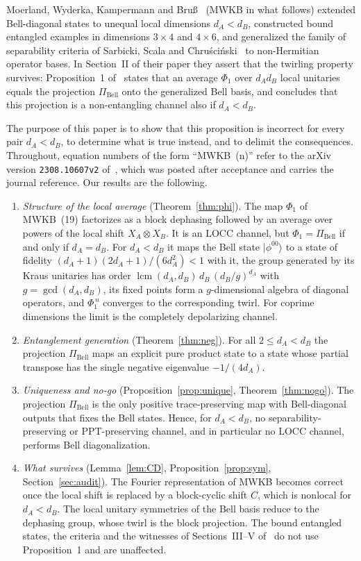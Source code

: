 \documentclass[11pt,a4paper]{article}
\theoremstyle{definition}
\theoremstyle{remark}
\newcommand{\ket}[1]{\lvert #1\rangle}
\newcommand{\dA}{d_A}
\newcommand{\dB}{d_B}
\newcommand{\PiB}{\Pi_{\mathrm{Bell}}}
\newcommand{\phib}[2]{\phi^{#1#2}}
\DeclareMathOperator{\lcm}{lcm}
\begin{document}
Moerland, Wyderka, Kampermann and Bru\ss{}~\cite{MWKB24} (MWKB in what follows) extended
Bell-diagonal states to unequal local dimensions $\dA<\dB$, constructed bound entangled
examples in dimensions $3\times4$ and $4\times6$, and generalized the family of separability
criteria of Sarbicki, Scala and Chru\'sci\'nski~\cite{SSC20} to non-Hermitian operator
bases. In Section~II of their paper they assert that the twirling property survives:
Proposition~1 of~\cite{MWKB24} states that an average $\Phi_1$ over $\dA\dB$ local unitaries
equals the projection $\PiB$ onto the generalized Bell basis, and concludes that this
projection is a non-entangling channel also if $\dA<\dB$.

The purpose of this paper is to show that this proposition is incorrect for every pair
$\dA<\dB$, to determine what is true instead, and to delimit the consequences. Throughout,
equation numbers of the form ``MWKB~(n)'' refer to the arXiv version
\texttt{2308.10607v2} of~\cite{MWKB24}, which was posted after acceptance and carries the
journal reference. Our results are the following.

\begin{enumerate}
\item \emph{Structure of the local average} (Theorem~\ref{thm:phi}). The map $\Phi_1$ of
MWKB~(19) factorizes as a block dephasing followed by an average over powers of the local
shift $X_A\otimes X_B$. It is an LOCC channel, but $\Phi_1=\PiB$ if and only if $\dA=\dB$.
For $\dA<\dB$ it maps the Bell state $\ket{\phib00}$ to a state of fidelity
$(\dA+1)(2\dA+1)/(6\dA^2)<1$ with it, the group generated by its Kraus unitaries has order
$\lcm(\dA,\dB)\,\dB\,(\dB/g)^{\dA}$ with $g=\gcd(\dA,\dB)$, its fixed points form a
$g$-dimensional algebra of diagonal operators, and $\Phi_1^{\,n}$ converges to the
corresponding twirl. For coprime dimensions the limit is the completely depolarizing
channel.
\item \emph{Entanglement generation} (Theorem~\ref{thm:neg}). For all $2\le\dA<\dB$ the
projection $\PiB$ maps an explicit pure product state to a state whose partial transpose
has the single negative eigenvalue $-1/(4\dA)$.
\item \emph{Uniqueness and no-go} (Proposition~\ref{prop:unique},
Theorem~\ref{thm:nogo}). The projection $\PiB$ is the only positive trace-preserving map
with Bell-diagonal outputs that fixes the Bell states. Hence, for $\dA<\dB$, no
separability-preserving or PPT-preserving channel, and in particular no LOCC channel,
performs Bell diagonalization.
\item \emph{What survives} (Lemma~\ref{lem:CD}, Proposition~\ref{prop:sym},
Section~\ref{sec:audit}). The Fourier representation of MWKB becomes correct once the local
shift is replaced by a block-cyclic shift $C$, which is nonlocal for $\dA<\dB$. The local
unitary symmetries of the Bell basis reduce to the dephasing group, whose twirl is the
block projection. The bound entangled states, the criteria and the witnesses of
Sections~III--V of~\cite{MWKB24} do not use Proposition~1 and are unaffected.
\end{enumerate}
\end{document}
